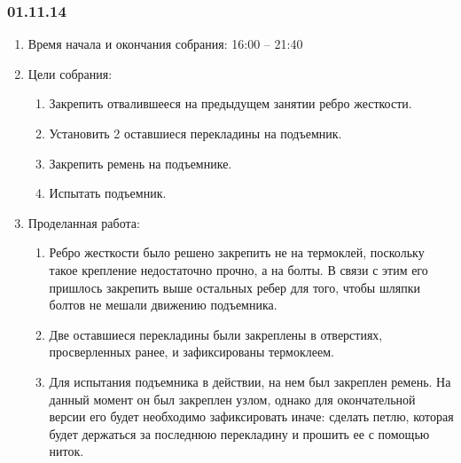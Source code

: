 
\subsubsection{01.11.14}

\begin{enumerate}
	\item Время начала и окончания собрания:
	16:00 – 21:40
	\item Цели собрания:
	\begin{enumerate}
	  \item Закрепить отвалившееся на предыдущем занятии ребро жесткости.
	  
	  \item	Установить 2 оставшиеся перекладины на подъемник.
	  
	  \item	Закрепить ремень на подъемнике.
	  
	  \item	Испытать подъемник.
	  
    \end{enumerate}
    
	\item Проделанная работа:
	\begin{enumerate}
	  \item	Ребро жесткости было решено закрепить не на термоклей, поскольку такое крепление недостаточно прочно, а на болты. В связи с этим его пришлось закрепить выше остальных ребер для того, чтобы шляпки болтов не мешали движению подъемника.
      
      \item Две оставшиеся перекладины были закреплены в отверстиях, просверленных ранее, и зафиксированы термоклеем.
      
      \item	Для испытания подъемника в действии, на нем был закреплен ремень. На данный момент он был закреплен узлом, однако для окончательной версии его будет необходимо зафиксировать иначе: сделать петлю, которая будет держаться за последнюю перекладину и прошить ее с помощью ниток.
      

\end{enumerate}
\end{enumerate}
